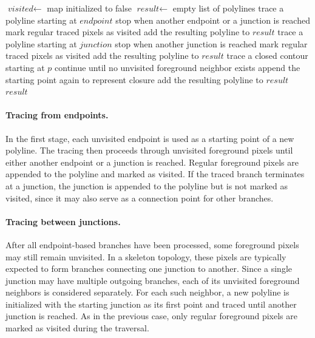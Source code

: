 {
\begin{algorithmic}[1]
	\State $\textit{visited} \gets$ map initialized to false
	\State $\textit{result} \gets$ empty list of polylines
	\State
			\State trace a polyline starting at $\textit{endpoint}$
			\State stop when another endpoint or a junction is reached
			\State mark regular traced pixels as visited
			\State add the resulting polyline to $\textit{result}$
		\EndIf
	\EndFor
	\State
			\State trace a polyline starting at $\textit{junction}$
			\State stop when another junction is reached
			\State mark regular traced pixels as visited
			\State add the resulting polyline to $\textit{result}$
		\EndFor
	\EndFor
	\State
	\State trace a closed contour starting at $p$
	\State continue until no unvisited foreground neighbor exists
	\State append the starting point again to represent closure
	\State add the resulting polyline to $\textit{result}$
	\EndFor
	\State
	\Return $\textit{result}$
	\EndProcedure
\end{algorithmic}
}

\paragraph{Tracing from endpoints.}
In the first stage, each unvisited endpoint is used as a starting point of a new polyline. The tracing then proceeds through unvisited foreground pixels until either another endpoint or a junction is reached. Regular foreground pixels are appended to the polyline and marked as visited. If the traced branch terminates at a junction, the junction is appended to the polyline but is not marked as visited, since it may also serve as a connection point for other branches.

\paragraph{Tracing between junctions.}
After all endpoint-based branches have been processed, some foreground pixels may still remain unvisited. In a skeleton topology, these pixels are typically expected to form branches connecting one junction to another. Since a single junction may have multiple outgoing branches, each of its unvisited foreground neighbors is considered separately. For each such neighbor, a new polyline is initialized with the starting junction as its first point and traced until another junction is reached. As in the previous case, only regular foreground pixels are marked as visited during the traversal.

